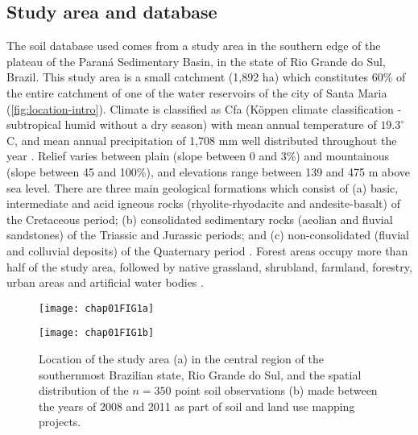 \subsection{Study area and database}\label{sec:intro-database}

The soil database used comes from a study area in the southern edge of the plateau of the Paraná 
Sedimentary Basin, in the state of Rio Grande do Sul, Brazil. This study area is a small catchment 
(1,892 ha) which constitutes 60\% of the entire catchment of one of the water reservoirs of the 
city of Santa Maria (\ref{fig:location-intro}). Climate is classified as Cfa (Köppen climate 
classification - subtropical humid without a dry season) with mean annual temperature of 
$19.3^{\circ}$C, and mean annual precipitation of 1,708 mm well distributed throughout the year 
\citep{Maluf2000}. Relief varies between plain (slope between 0 and 3\%) and mountainous (slope 
between 45 and 100\%), and elevations range between 139 and 475 m above sea level. There are three 
main geological formations which consist of (a) basic, intermediate and acid igneous rocks 
(rhyolite-rhyodacite and andesite-basalt) of the Cretaceous period; (b) consolidated sedimentary 
rocks (aeolian and fluvial sandstones) of the Triassic and Jurassic periods; and (c) 
non-consolidated (fluvial and colluvial deposits) of the Quaternary period 
\citep{GasparettoEtAl1988, MacielFilho1990, Sartori2009}. Forest areas occupy more than half of the
study area, followed by native grassland, shrubland, farmland, forestry, urban areas and artificial 
water bodies \citep{SamuelRosaEtAl2011a}.

\begin{figure}[!ht]
    \centering
    \begin{minipage}[b]{95mm}
      \subcaption{}
      \label{fig:brazil}
      \centering
      \texttt{[image: chap01FIG1a]}
    \end{minipage}
    \begin{minipage}[b]{95mm}
      \subcaption{}
      \label{fig:points}
      \centering
      \texttt{[image: chap01FIG1b]}
    \end{minipage}
  \caption{Location of the study area (a) in the central region of the southernmost Brazilian state, 
  Rio Grande do Sul, and the spatial distribution of the $n=350$ point soil observations (b) made 
  between the years of 2008 and 2011 as part of soil and land use mapping projects.}
  \label{fig:intro-location}
\end{figure}

